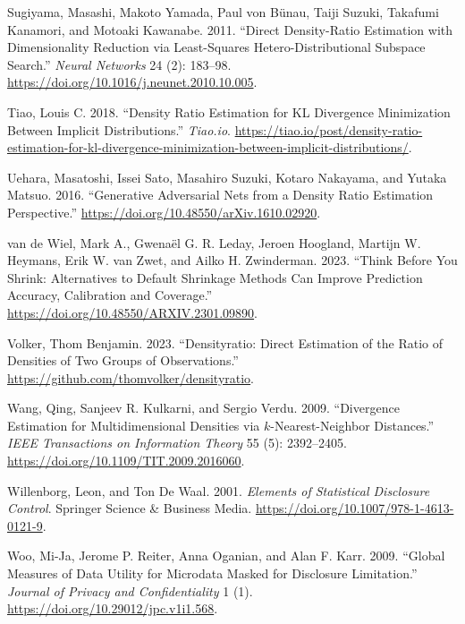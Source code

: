 \documentclass[
]{article}
\newlength{\cslhangindent}
\newenvironment{CSLReferences}[2] %
 {\begin{list}{}{%
  \setlength{\itemindent}{0pt}
  \setlength{\leftmargin}{0pt}
  \setlength{\parsep}{0pt}
  \ifodd #1
   \setlength{\leftmargin}{\cslhangindent}
   \setlength{\itemindent}{-1\cslhangindent}
  \fi
  \setlength{\itemsep}{#2\baselineskip}}}
 {\end{list}}
\begin{document}
\begin{CSLReferences}{1}{0}
Sugiyama, Masashi, Makoto Yamada, Paul von Bünau, Taiji Suzuki, Takafumi
Kanamori, and Motoaki Kawanabe. 2011. {``Direct Density-Ratio Estimation
with Dimensionality Reduction via Least-Squares Hetero-Distributional
Subspace Search.''} \emph{Neural Networks} 24 (2): 183--98.
\url{https://doi.org/10.1016/j.neunet.2010.10.005}.

Tiao, Louis C. 2018. {``{D}ensity {R}atio {E}stimation for {KL}
{D}ivergence {M}inimization Between {I}mplicit {D}istributions.''}
\emph{Tiao.io}.
\url{https://tiao.io/post/density-ratio-estimation-for-kl-divergence-minimization-between-implicit-distributions/}.

Uehara, Masatoshi, Issei Sato, Masahiro Suzuki, Kotaro Nakayama, and
Yutaka Matsuo. 2016. {``Generative Adversarial Nets from a Density Ratio
Estimation Perspective.''}
\url{https://doi.org/10.48550/arXiv.1610.02920}.

van de Wiel, Mark A., Gwenaël G. R. Leday, Jeroen Hoogland, Martijn W.
Heymans, Erik W. van Zwet, and Ailko H. Zwinderman. 2023. {``Think
Before You Shrink: Alternatives to Default Shrinkage Methods Can Improve
Prediction Accuracy, Calibration and Coverage.''}
\url{https://doi.org/10.48550/ARXIV.2301.09890}.

Volker, Thom Benjamin. 2023. {``Densityratio: Direct Estimation of the
Ratio of Densities of Two Groups of Observations.''}
\url{https://github.com/thomvolker/densityratio}.

Wang, Qing, Sanjeev R. Kulkarni, and Sergio Verdu. 2009. {``Divergence
Estimation for Multidimensional Densities via \(k\)-Nearest-Neighbor
Distances.''} \emph{IEEE Transactions on Information Theory} 55 (5):
2392--2405. \url{https://doi.org/10.1109/TIT.2009.2016060}.

Willenborg, Leon, and Ton De Waal. 2001. \emph{Elements of Statistical
Disclosure Control}. Springer Science \& Business Media.
\url{https://doi.org/10.1007/978-1-4613-0121-9}.

Woo, Mi-Ja, Jerome P. Reiter, Anna Oganian, and Alan F. Karr. 2009.
{``Global Measures of Data Utility for Microdata Masked for Disclosure
Limitation.''} \emph{Journal of Privacy and Confidentiality} 1 (1).
\url{https://doi.org/10.29012/jpc.v1i1.568}.


\end{CSLReferences}
\end{document}
